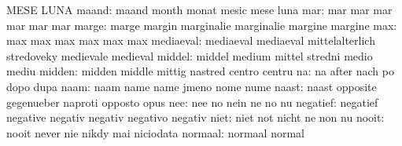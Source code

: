                            MESE                      LUNA
                    maand: maand                     month
                           monat                     mesic
                           mese                      luna
                      mar: mar                       mar
                           mar                       mar
                           mar                       mar
                    marge: marge                     margin
                           marginalie                marginalie
                           margine                   margine
                      max: max                       max
                           max                       max
                           max                       max
                mediaeval: mediaeval                 mediaeval
                           mittelalterlich           stredoveky
                           medievale                 medieval
                   middel: middel                    medium
                           mittel                    stredni
                           medio                     mediu
                   midden: midden                    middle
                           mittig                    nastred
                           centro                    centru
                       na: na                        after
                           nach                      po
                           dopo                      dupa
                     naam: naam                      name
                           name                      jmeno
                           nome                      nume
                    naast: naast                     opposite
                           gegenueber                naproti
                           opposto                   opus
                      nee: nee                       no
                           nein                      ne
                           no                        nu
                 negatief: negatief                  negative
                           negativ                   negativ
                           negativo                  negativ
                     niet: niet                      not
                           nicht                     ne
                           non                       nu
                    nooit: nooit                     never
                           nie                       nikdy
                           mai                       niciodata
                  normaal: normaal                   normal
